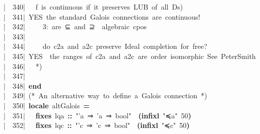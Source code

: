 \documentclass{article}
\newcommand{\syntaxCOMMENTA}[1]{\textcolor[rgb]{0.8,0.0,0.0}{#1}}
\newcommand{\syntaxKEYWORDA}[1]{\textcolor[rgb]{0.0,0.4,0.6}{\textbf{#1}}}
\newcommand{\syntaxKEYWORDB}[1]{\textcolor[rgb]{0.0,0.6,0.4}{\textbf{#1}}}
\newcommand{\syntaxLITERALA}[1]{\textcolor[rgb]{1.0,0.0,0.8}{#1}}
\newcommand{\syntaxOPERATOR}[1]{\textcolor[rgb]{0.0,0.0,0.0}{\textbf{#1}}}
\newcommand{\syntaxCOMMENTA}[1]{\textcolor[rgb]{0.8,0.0,0.0}{#1}}
\newcommand{\syntaxKEYWORDA}[1]{\textcolor[rgb]{0.0,0.4,0.6}{\textbf{#1}}}
\newcommand{\syntaxKEYWORDB}[1]{\textcolor[rgb]{0.0,0.6,0.4}{\textbf{#1}}}
\newcommand{\syntaxLITERALA}[1]{\textcolor[rgb]{1.0,0.0,0.8}{#1}}
\newcommand{\syntaxOPERATOR}[1]{\textcolor[rgb]{0.0,0.0,0.0}{\textbf{#1}}}
\newcommand{\syntaxCOMMENTA}[1]{\textcolor[rgb]{0.8,0.0,0.0}{#1}}
\newcommand{\syntaxKEYWORDA}[1]{\textcolor[rgb]{0.0,0.4,0.6}{\textbf{#1}}}
\newcommand{\syntaxKEYWORDB}[1]{\textcolor[rgb]{0.0,0.6,0.4}{\textbf{#1}}}
\newcommand{\syntaxLITERALA}[1]{\textcolor[rgb]{1.0,0.0,0.8}{#1}}
\newcommand{\syntaxOPERATOR}[1]{\textcolor[rgb]{0.0,0.0,0.0}{\textbf{#1}}}
\newcommand{\syntaxCOMMENTA}[1]{\textcolor[rgb]{0.8,0.0,0.0}{\textbf{#1}}}
\newcommand{\syntaxKEYWORDA}[1]{\textcolor[rgb]{0.0,0.4,0.6}{#1}}
\newcommand{\syntaxKEYWORDB}[1]{\textcolor[rgb]{0.0,0.6,0.4}{#1}}
\newcommand{\syntaxLITERALA}[1]{\textcolor[rgb]{1.0,0.0,0.8}{\textbf{#1}}}
\newcommand{\syntaxOPERATOR}[1]{\textcolor[rgb]{0.0,0.0,0.0}{#1}}
\newcommand{\syntaxCOMMENTA}[1]{\textcolor[rgb]{0.8,0.0,0.0}{#1}}
\newcommand{\syntaxKEYWORDA}[1]{\textcolor[rgb]{0.0,0.4,0.6}{\textbf{#1}}}
\newcommand{\syntaxKEYWORDB}[1]{\textcolor[rgb]{0.0,0.6,0.4}{\textbf{#1}}}
\newcommand{\syntaxLITERALA}[1]{\textcolor[rgb]{1.0,0.0,0.8}{#1}}
\newcommand{\syntaxOPERATOR}[1]{\textcolor[rgb]{0.0,0.0,0.0}{\textbf{#1}}}
\newcommand{\syntaxCOMMENTA}[1]{\textcolor[rgb]{0.8,0.0,0.0}{#1}}
\newcommand{\syntaxKEYWORDA}[1]{\textcolor[rgb]{0.0,0.4,0.6}{\textbf{#1}}}
\newcommand{\syntaxKEYWORDB}[1]{\textcolor[rgb]{0.0,0.6,0.4}{\textbf{#1}}}
\newcommand{\syntaxLITERALA}[1]{\textcolor[rgb]{1.0,0.0,0.8}{#1}}
\newcommand{\syntaxOPERATOR}[1]{\textcolor[rgb]{0.0,0.0,0.0}{\textbf{#1}}}
\newcommand{\syntaxCOMMENTA}[1]{\textcolor[rgb]{0.0,0.0,0.0}{#1}}
\newcommand{\syntaxKEYWORDA}[1]{\textcolor[rgb]{0.0,0.0,0.0}{#1}}
\newcommand{\syntaxKEYWORDB}[1]{\textcolor[rgb]{0.0,0.0,0.0}{#1}}
\newcommand{\gutter}[1]{\textcolor[rgb]{0,0,0}{{|}#1}}
\newcommand{\gutterH}[1]{\textcolor[rgb]{1,0,0}{{|}#1}}
\begin{document}
\gutterH{\ \ 340{|}\ }\syntaxCOMMENTA{{\ }{\ }f{\ }is{\ }continuous{\ }if{\ }it{\ }preserves{\ }LUB{\ }of{\ }all{\ }Ds)}\hspace*{\fill}\\
\gutter{\ \ 341{|}\ }\syntaxCOMMENTA{YES{\ }the{\ }standard{\ }Galois{\ }connections{\ }are{\ }continuous!}\hspace*{\fill}\\
\gutter{\ \ 342{|}\ }\syntaxCOMMENTA{{\ }{\ }{\ }{\ }3:{\ }are{\ }⊆{\ }and{\ }⊇{\ }{\ }algebraic{\ }cpos}\hspace*{\fill}\\
\gutter{\ \ 343{|}\ }\hspace*{\fill}\\
\gutter{\ \ 344{|}\ }\syntaxCOMMENTA{{\ }{\ }{\ }{\ }do{\ }c2a{\ }and{\ }a2c{\ }preserve{\ }Ideal{\ }completion{\ }for{\ }free?{\ }}\hspace*{\fill}\\
\gutterH{\ \ 345{|}\ }\syntaxCOMMENTA{YES{\ }{\ }the{\ }ranges{\ }of{\ }c2a{\ }and{\ }a2c{\ }are{\ }order{\ }isomorphic{\ }See{\ }PeterSmith}\hspace*{\fill}\\
\gutter{\ \ 346{|}\ }\syntaxCOMMENTA{{\ }{\ }*)}\hspace*{\fill}\\
\gutter{\ \ 347{|}\ }{\ }{\ }{\ }{\ }{\ }{\ }\hspace*{\fill}\\
\gutter{\ \ 348{|}\ }\syntaxKEYWORDB{end}\hspace*{\fill}\\
\gutter{\ \ 349{|}\ }\syntaxCOMMENTA{(*{\ }An{\ }alternative{\ }way{\ }to{\ }define{\ }a{\ }Galois{\ }connection{\ }*)}\hspace*{\fill}\\
\gutterH{\ \ 350{|}\ }\syntaxKEYWORDA{locale}{\ }altGalois{\ }\syntaxOPERATOR{=}{\ }\hspace*{\fill}\\
\gutter{\ \ 351{|}\ }{\ }{\ }\syntaxKEYWORDB{fixes}{\ }lqa{\ }\syntaxOPERATOR{::}{\ }\syntaxLITERALA{"'a{\ }⇒{\ }'a{\ }⇒{\ }bool"}{\ }{\ }\syntaxOPERATOR{(}\syntaxKEYWORDB{infixl}{\ }\syntaxLITERALA{"≼a"}{\ }50\syntaxOPERATOR{)}\hspace*{\fill}\\
\gutter{\ \ 352{|}\ }{\ }{\ }\syntaxKEYWORDB{fixes}{\ }lqc{\ }\syntaxOPERATOR{::}{\ }\syntaxLITERALA{"'c{\ }⇒{\ }'c{\ }⇒{\ }bool"}{\ }{\ }\syntaxOPERATOR{(}\syntaxKEYWORDB{infixl}{\ }\syntaxLITERALA{"≼c"}{\ }50\syntaxOPERATOR{)}\hspace*{\fill}\\
\end{document}

